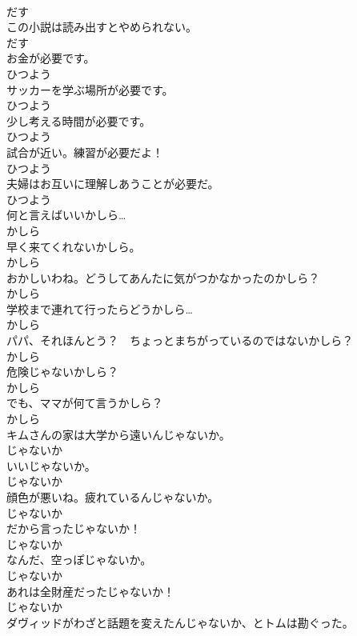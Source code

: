 \documentclass[8pt]{extreport}
\begin{document}
\begin{CJK}{UTF8}{min}
\\	だす	
\\	この小説は読み出すとやめられない。	
\\	だす	
\\	お金が必要です。	
\\	ひつよう	
\\	サッカーを学ぶ場所が必要です。	
\\	ひつよう	
\\	少し考える時間が必要です。	
\\	ひつよう	
\\	試合が近い。練習が必要だよ！	
\\	ひつよう	
\\	夫婦はお互いに理解しあうことが必要だ。	
\\	ひつよう	
\\	何と言えばいいかしら…	
\\	かしら	
\\	早く来てくれないかしら。	
\\	かしら	
\\	おかしいわね。どうしてあんたに気がつかなかったのかしら？	
\\	かしら	
\\	学校まで連れて行ったらどうかしら…	
\\	かしら	
\\	パパ、それほんとう？　ちょっとまちがっているのではないかしら？	
\\	かしら	
\\	危険じゃないかしら？	
\\	かしら	
\\	でも、ママが何て言うかしら？	
\\	かしら	
\\	キムさんの家は大学から遠いんじゃないか。	
\\	じゃないか	
\\	いいじゃないか。	
\\	じゃないか	
\\	顔色が悪いね。疲れているんじゃないか。	
\\	じゃないか	
\\	だから言ったじゃないか！	
\\	じゃないか	
\\	なんだ、空っぽじゃないか。	
\\	じゃないか	
\\	あれは全財産だったじゃないか！	
\\	じゃないか	
\\	ダヴィッドがわざと話題を変えたんじゃないか、とトムは勘ぐった。	

\end{CJK}
\end{document}
